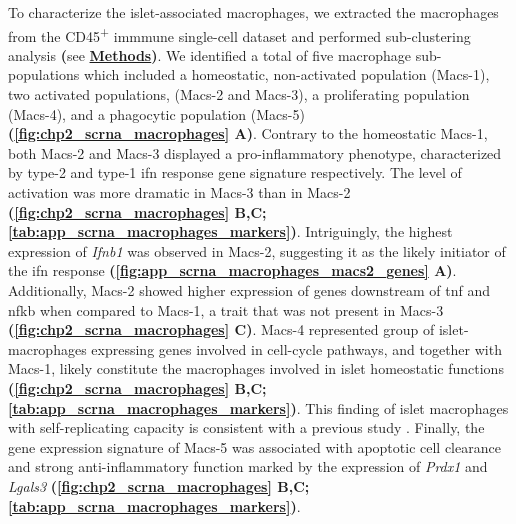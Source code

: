 \par To characterize the islet-associated macrophages, we extracted the macrophages from the CD45\textsuperscript{+} immmune single-cell dataset and performed sub-clustering analysis \textbf{(}see \hyperref[subsubsec:met_chp2_immuneendo]{\textbf{Methods}}\textbf{)}. We identified a total of five macrophage sub-populations which included a homeostatic, non-activated population (Macs-1), two activated populations, (Macs-2 and Macs-3), a proliferating population (Macs-4), and a phagocytic population (Macs-5) \textbf{(\autoref{fig:chp2_scrna_macrophages} A)}. Contrary to the homeostatic Macs-1, both Macs-2 and Macs-3 displayed a pro-inflammatory phenotype, characterized by type-2 and type-1 \gls{ifn} response gene signature respectively. The level of activation was more dramatic in Macs-3 than in Macs-2 \textbf{(\autoref{fig:chp2_scrna_macrophages} B,C; \autoref{tab:app_scrna_macrophages_markers})}. Intriguingly, the highest expression of \textit{Ifnb1} was observed in Macs-2, suggesting it as the likely initiator of the \gls{ifn} response \textbf{(\autoref{fig:app_scrna_macrophages_macs2_genes} A)}. Additionally, Macs-2 showed higher expression of genes downstream of \gls{tnf} and \gls{nfkb} when compared to Macs-1, a trait that was not present in Macs-3 \textbf{(\autoref{fig:chp2_scrna_macrophages} C)}. Macs-4 represented group of islet-macrophages expressing genes involved in cell-cycle pathways, and together with Macs-1, likely constitute the macrophages involved in islet homeostatic functions \textbf{(\autoref{fig:chp2_scrna_macrophages} B,C; \autoref{tab:app_scrna_macrophages_markers})}. This finding of islet macrophages with self-replicating capacity is consistent with a previous study \textbf{\cite{calderon_pancreas_2015}}. Finally, the gene expression signature of Macs-5 was associated with apoptotic cell clearance and strong anti-inflammatory function marked by the expression of \textit{Prdx1} and \textit{Lgals3} \textbf{(\autoref{fig:chp2_scrna_macrophages} B,C; \autoref{tab:app_scrna_macrophages_markers})}.\\

